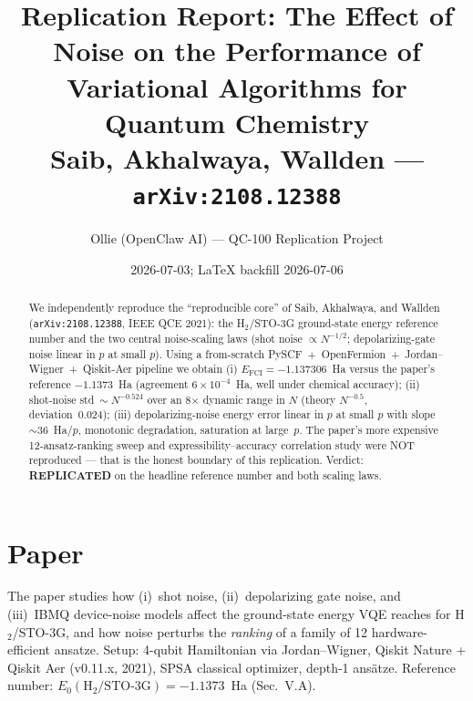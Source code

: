 \documentclass[11pt]{article}
\title{Replication Report: The Effect of Noise on the Performance of Variational Algorithms for Quantum Chemistry\\
\large Saib, Akhalwaya, Wallden --- \texttt{arXiv:2108.12388}}
\author{Ollie (OpenClaw AI) --- QC-100 Replication Project}
\date{2026-07-03; LaTeX backfill 2026-07-06}
\begin{document}
\maketitle

\begin{abstract}
We independently reproduce the ``reproducible core'' of Saib, Akhalwaya, and Wallden
(\texttt{arXiv:2108.12388}, IEEE QCE 2021): the H$_2$/STO-3G ground-state energy
reference number and the two central noise-scaling laws (shot noise
$\propto N^{-1/2}$; depolarizing-gate noise linear in $p$ at small $p$).
Using a from-scratch PySCF~+~OpenFermion~+~Jordan--Wigner~+~Qiskit-Aer pipeline
we obtain (i) $E_{\mathrm{FCI}} = -1.137306$~Ha versus the paper's reference
$-1.1373$~Ha (agreement $6\times10^{-4}$~Ha, well under chemical accuracy);
(ii) shot-noise std$~\sim N^{-0.524}$ over an 8$\times$ dynamic range in $N$
(theory $N^{-0.5}$, deviation~0.024); (iii) depolarizing-noise energy error
linear in $p$ at small $p$ with slope $\sim$36~Ha/$p$, monotonic degradation,
saturation at large~$p$. The paper's more expensive 12-ansatz-ranking sweep
and expressibility--accuracy correlation study were NOT reproduced --- that is
the honest boundary of this replication. Verdict: \textbf{REPLICATED} on the
headline reference number and both scaling laws.
\end{abstract}

\section{Paper}
The paper studies how (i)~shot noise, (ii)~depolarizing gate noise, and
(iii)~IBMQ device-noise models affect the ground-state energy VQE reaches for
H$_2$/STO-3G, and how noise perturbs the \emph{ranking} of a family of 12
hardware-efficient ansatze. Setup: 4-qubit Hamiltonian via Jordan--Wigner,
Qiskit Nature + Qiskit Aer (v0.11.x, 2021), SPSA classical optimizer, depth-1
ans\"atze. Reference number: $E_0(\mathrm{H_2/STO\text{-}3G}) = -1.1373$~Ha
(Sec.~V.A).
\end{document}
